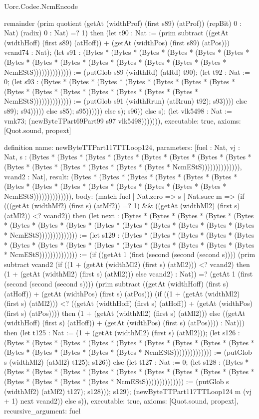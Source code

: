 \begin{lexlean}{Uorc.Codec.NcmEncode}
\begin{semanticmodule}
{remainder (prim quotient (getAt (widthProf) (first s89) (atProf)) (repBit) 0 : Nat) (radix) 0 : Nat) =? 1) then (let t90 : Nat := (prim subtract ((getAt (widthHoff) (first s89) (atHoff)) + (getAt (widthPos) (first s89) (atPos))) vcand74 : Nat); (let s91 : (Bytes * (Bytes * (Bytes * (Bytes * (Bytes * (Bytes * (Bytes * (Bytes * (Bytes * (Bytes * (Bytes * (Bytes * (Bytes * (Bytes * NcmEStS)))))))))))))) := (putGlob s89 (widthRd) (atRd) t90); (let t92 : Nat := 0; (let s93 : (Bytes * (Bytes * (Bytes * (Bytes * (Bytes * (Bytes * (Bytes * (Bytes * (Bytes * (Bytes * (Bytes * (Bytes * (Bytes * (Bytes * NcmEStS)))))))))))))) := (putGlob s91 (widthRrun) (atRrun) t92); s93)))) else s89); s94))))) else s85); s95)))))) else s); s96)) else s); (let vlk5498 : Nat := vmk73; (newByteTPart69Part99 s97 vlk5498))))))),
  executable: true,
  axioms: [Quot.sound, propext]
}

definition{
  name: newByteTTPart117TTLoop124,
  parameters: [fuel : Nat, vj : Nat, s : (Bytes * (Bytes * (Bytes * (Bytes * (Bytes * (Bytes * (Bytes * (Bytes * (Bytes * (Bytes * (Bytes * (Bytes * (Bytes * (Bytes * NcmEStS)))))))))))))), vcand2 : Nat],
  result: (Bytes * (Bytes * (Bytes * (Bytes * (Bytes * (Bytes * (Bytes * (Bytes * (Bytes * (Bytes * (Bytes * (Bytes * (Bytes * (Bytes * NcmEStS)))))))))))))),
  body: (match fuel
    | Nat.zero => s
    | Nat.succ m => (if (((getAt (widthMf2) (first s) (atMf2)) =? 1) && ((getAt (widthMl2) (first s) (atMl2)) <? vcand2)) then (let next : (Bytes * (Bytes * (Bytes * (Bytes * (Bytes * (Bytes * (Bytes * (Bytes * (Bytes * (Bytes * (Bytes * (Bytes * (Bytes * (Bytes * NcmEStS)))))))))))))) := (let s129 : (Bytes * (Bytes * (Bytes * (Bytes * (Bytes * (Bytes * (Bytes * (Bytes * (Bytes * (Bytes * (Bytes * (Bytes * (Bytes * (Bytes * NcmEStS)))))))))))))) := (if ((getAt 1 (first (second (second (second s)))) (prim subtract vcand2 (if ((1 + (getAt (widthMl2) (first s) (atMl2))) <? vcand2) then (1 + (getAt (widthMl2) (first s) (atMl2))) else vcand2) : Nat)) =? (getAt 1 (first (second (second (second s)))) (prim subtract ((getAt (widthHoff) (first s) (atHoff)) + (getAt (widthPos) (first s) (atPos))) (if ((1 + (getAt (widthMl2) (first s) (atMl2))) <? ((getAt (widthHoff) (first s) (atHoff)) + (getAt (widthPos) (first s) (atPos)))) then (1 + (getAt (widthMl2) (first s) (atMl2))) else ((getAt (widthHoff) (first s) (atHoff)) + (getAt (widthPos) (first s) (atPos)))) : Nat))) then (let t125 : Nat := (1 + (getAt (widthMl2) (first s) (atMl2))); (let s126 : (Bytes * (Bytes * (Bytes * (Bytes * (Bytes * (Bytes * (Bytes * (Bytes * (Bytes * (Bytes * (Bytes * (Bytes * (Bytes * (Bytes * NcmEStS)))))))))))))) := (putGlob s (widthMl2) (atMl2) t125); s126)) else (let t127 : Nat := 0; (let s128 : (Bytes * (Bytes * (Bytes * (Bytes * (Bytes * (Bytes * (Bytes * (Bytes * (Bytes * (Bytes * (Bytes * (Bytes * (Bytes * (Bytes * NcmEStS)))))))))))))) := (putGlob s (widthMf2) (atMf2) t127); s128))); s129); (newByteTTPart117TTLoop124 m (vj + 1) next vcand2)) else s)),
  executable: true,
  axioms: [Quot.sound, propext],
  recursive_argument: fuel
}


\end{semanticmodule}
\end{lexlean}
